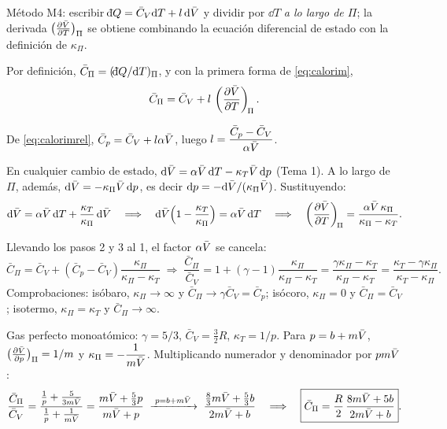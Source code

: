\begin{resolucion}
\idea Método M4: escribir $\dbar Q=\bar C_V\dd T+l\,\dd\Vm$ y dividir por $\dd T$ \emph{a lo largo de $\Pi$}; la
derivada $\bigl(\tfrac{\partial \bar{V}}{\partial T}\bigr)_{\Pi}$ se obtiene combinando la ecuación diferencial de estado con la definición de
$\kappa_\Pi$.

 Por definición, $\bar C_\Pi=(\dbar Q/\dd T)_\Pi$, y con la primera forma de
\eqref{eq:calorim},
\[
  \bar C_\Pi=\bar C_V+l\,\left(\frac{\partial \bar{V}}{\partial T}\right)_{\!\Pi}.
\]

 De \eqref{eq:calorimrel}, $\bar C_p=\bar C_V+l\alpha\bar{V}$, luego
$l=\dfrac{\bar C_p-\bar C_V}{\alpha\bar{V}}$.

 En cualquier cambio de estado,
$\mathrm{d}\bar{V}=\alpha\bar{V}\,\mathrm{d} T-\kappa_T\bar{V}\,\mathrm{d} p$ (Tema 1). A lo largo de $\Pi$, además,
$\mathrm{d}\bar{V}=-\kappa_\Pi\bar{V}\,\mathrm{d} p$, es decir $\mathrm{d} p=-\mathrm{d}\bar{V}/(\kappa_\Pi\bar{V})$. Sustituyendo:
\[
  \mathrm{d}\bar{V}=\alpha\bar{V}\,\mathrm{d} T+\frac{\kappa_T}{\kappa_\Pi}\,\mathrm{d}\bar{V}
  \quad\Longrightarrow\quad
  \mathrm{d}\bar{V}\Bigl(1-\frac{\kappa_T}{\kappa_\Pi}\Bigr)=\alpha\bar{V}\,\mathrm{d} T
  \quad\Longrightarrow\quad
  \left(\frac{\partial \bar{V}}{\partial T}\right)_{\!\Pi}=\frac{\alpha\bar{V}\,\kappa_\Pi}{\kappa_\Pi-\kappa_T}.
\]

 Llevando los pasos 2 y 3 al 1, el factor $\alpha\bar{V}$ se cancela:
\[
  \bar C_\Pi=\bar C_V+(\bar C_p-\bar C_V)\frac{\kappa_\Pi}{\kappa_\Pi-\kappa_T}
  \;\Longrightarrow\;
  \frac{\bar C_\Pi}{\bar C_V}=1+(\gamma-1)\frac{\kappa_\Pi}{\kappa_\Pi-\kappa_T}
  =\frac{\gamma\kappa_\Pi-\kappa_T}{\kappa_\Pi-\kappa_T}
  =\boxed{\frac{\kappa_T-\gamma\kappa_\Pi}{\kappa_T-\kappa_\Pi}}.
\]
Comprobaciones: isóbaro, $\kappa_\Pi\to\infty$ y $\bar C_\Pi\to\gamma\bar C_V=\bar C_p$; isócoro, $\kappa_\Pi=0$ y
$\bar C_\Pi=\bar C_V$; isotermo, $\kappa_\Pi=\kappa_T$ y $\bar C_\Pi\to\infty$.

 Gas perfecto monoatómico: $\gamma=5/3$, $\bar C_V=\tfrac32R$, $\kappa_T=1/p$. Para
$p=b+m\bar{V}$, $\bigl(\tfrac{\partial \bar{V}}{\partial p}\bigr)_{\Pi}=1/m$ y $\kappa_\Pi=-\dfrac{1}{m\bar{V}}$. Multiplicando numerador y denominador por
$pm\bar{V}$:
\[
  \frac{\bar C_\Pi}{\bar C_V}=\frac{\frac1p+\frac{5}{3m\bar{V}}}{\frac1p+\frac{1}{m\bar{V}}}
  =\frac{m\bar{V}+\frac53p}{m\bar{V}+p}
  \;\xrightarrow{\;p=b+m\bar{V}\;}\;
  \frac{\frac83m\bar{V}+\frac53b}{2m\bar{V}+b}
  \quad\Longrightarrow\quad
  \boxed{\bar C_\Pi=\frac R2\,\frac{8m\bar{V}+5b}{2m\bar{V}+b}}.
\]
\end{resolucion}

